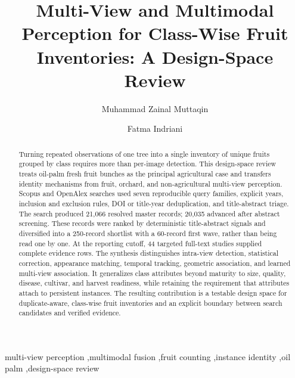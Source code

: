\documentclass[review]{elsarticle}
\begin{document}
\begin{frontmatter}
\title{Multi-View and Multimodal Perception for Class-Wise Fruit Inventories: A Design-Space Review}
\author[a]{Muhammad Zainal Muttaqin}
\author[a]{Fatma Indriani}
\begin{abstract}
Turning repeated observations of one tree into a single inventory of unique fruits grouped by class requires more than per-image detection. This design-space review treats oil-palm fresh fruit bunches as the principal agricultural case and transfers identity mechanisms from fruit, orchard, and non-agricultural multi-view perception. Scopus and OpenAlex searches used seven reproducible query families, explicit years, inclusion and exclusion rules, DOI or title-year deduplication, and title-abstract triage. The search produced 21,066 resolved master records; 20,035 advanced after abstract screening. These records were ranked by deterministic title-abstract signals and diversified into a 250-record shortlist with a 60-record first wave, rather than being read one by one. At the reporting cutoff, 44 targeted full-text studies supplied complete evidence rows. The synthesis distinguishes intra-view detection, statistical correction, appearance matching, temporal tracking, geometric association, and learned multi-view association. It generalizes class attributes beyond maturity to size, quality, disease, cultivar, and harvest readiness, while retaining the requirement that attributes attach to persistent instances. The resulting contribution is a testable design space for duplicate-aware, class-wise fruit inventories and an explicit boundary between search candidates and verified evidence.
\end{abstract}
\begin{keyword}
multi-view perception \sep multimodal fusion \sep fruit counting \sep instance identity \sep oil palm \sep design-space review
\end{keyword}
\end{frontmatter}



\end{document}
